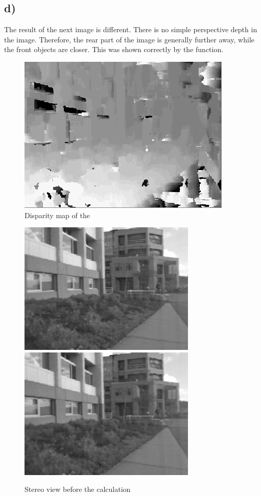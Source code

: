 \documentclass{article}
\begin{document}
	\subsection{d)}
	The result of the next image is different. There is no simple perspective depth in the image. Therefore, the rear part of the image is generally further away, while the front objects are closer. This was shown correctly by the function.
	\begin{figure}[!h]
		\center
		\caption{Disparity map of the }
		\includegraphics{triclopsi_disp.png}
	\end{figure}
		\begin{figure}
		\center
		\caption{Stereo view before the calculation}
		\includegraphics[scale=0.4]{triclopsi2l.jpg}
		\includegraphics[scale=0.4]{triclopsi2r.jpg}
	\end{figure}
	
\end{document}
